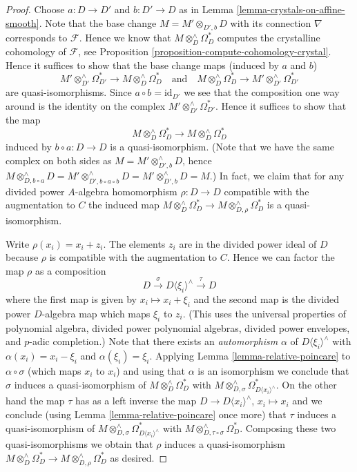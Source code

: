 \begin{proof}
Choose $a : D \to D'$ and $b : D' \to D$ as in
Lemma \ref{lemma-crystals-on-affine-smooth}.
Note that the base change $M = M' \otimes_{D', b} D$ with its
connection $\nabla$ corresponds to $\mathcal{F}$. Hence we know
that $M \otimes^\wedge_D \Omega_D^*$ computes the crystalline
cohomology of $\mathcal{F}$, see
Proposition \ref{proposition-compute-cohomology-crystal}.
Hence it suffices to show that the base change maps (induced
by $a$ and $b$)
$$
M' \otimes^\wedge_{D'} \Omega^*_{D'}
\longrightarrow
M \otimes^\wedge_D \Omega^*_D
\quad\text{and}\quad
M \otimes^\wedge_D \Omega^*_D
\longrightarrow
M' \otimes^\wedge_{D'} \Omega^*_{D'}
$$
are quasi-isomorphisms. Since $a \circ b = \text{id}_{D'}$ we see
that the composition one way around is the identity on the complex
$M' \otimes^\wedge_{D'} \Omega^*_{D'}$. Hence it suffices to show that
the map
$$
M \otimes^\wedge_D \Omega^*_D
\longrightarrow
M \otimes^\wedge_D \Omega^*_D
$$
induced by $b \circ a : D \to D$ is a quasi-isomorphism. (Note that we
have the same complex on both sides as $M = M' \otimes^\wedge_{D', b} D$,
hence $M \otimes^\wedge_{D, b \circ a} D =
M' \otimes^\wedge_{D', b \circ a \circ b} D =
M' \otimes^\wedge_{D', b} D = M$.) In fact, we claim that for any
divided power $A$-algebra homomorphism $\rho : D \to D$ compatible
with the augmentation to $C$ the induced map
$M \otimes^\wedge_D \Omega^*_D \to M \otimes^\wedge_{D, \rho} \Omega^*_D$
is a quasi-isomorphism.

\medskip\noindent
Write $\rho(x_i) = x_i + z_i$. The elements $z_i$ are in the
divided power ideal of $D$ because $\rho$ is compatible with the
augmentation to $C$. Hence we can factor the map $\rho$
as a composition
$$
D \xrightarrow{\sigma} D\langle \xi_i \rangle^\wedge \xrightarrow{\tau} D
$$
where the first map is given by $x_i \mapsto x_i + \xi_i$ and the
second map is the divided power $D$-algebra map which maps $\xi_i$ to $z_i$.
(This uses the universal properties of polynomial algebra, divided
power polynomial algebras, divided power envelopes, and $p$-adic completion.)
Note that there exists an {\it automorphism} $\alpha$ of
$D\langle \xi_i \rangle^\wedge$ with $\alpha(x_i) = x_i - \xi_i$
and $\alpha(\xi_i) = \xi_i$. Applying Lemma \ref{lemma-relative-poincare}
to $\alpha \circ \sigma$ (which maps $x_i$ to $x_i$) and using that
$\alpha$ is an isomorphism we conclude that $\sigma$ induces a
quasi-isomorphism of $M \otimes^\wedge_D \Omega^*_D$ with
$M \otimes^\wedge_{D, \sigma} \Omega^*_{D\langle x_i \rangle^\wedge}$.
On the other hand the map $\tau$ has as a left inverse the
map $D \to D\langle x_i \rangle^\wedge$, $x_i \mapsto x_i$
and we conclude (using Lemma \ref{lemma-relative-poincare} once more)
that $\tau$ induces a quasi-isomorphism of
$M \otimes^\wedge_{D, \sigma} \Omega^*_{D\langle x_i \rangle^\wedge}$
with $M \otimes^\wedge_{D, \tau \circ \sigma} \Omega^*_D$. Composing these
two quasi-isomorphisms we obtain that $\rho$ induces a quasi-isomorphism
$M \otimes^\wedge_D \Omega^*_D \to M \otimes^\wedge_{D, \rho} \Omega^*_D$
as desired.
\end{proof}










